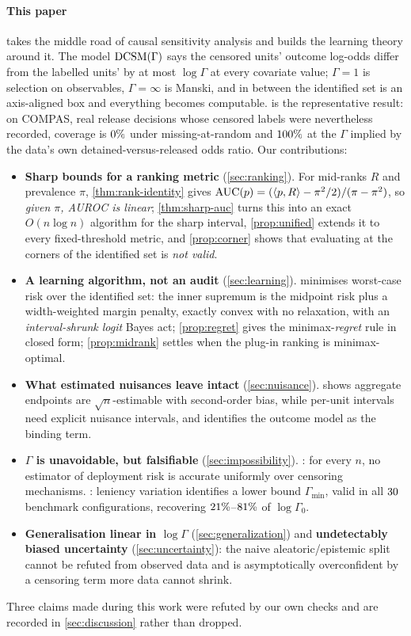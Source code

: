 \paragraph{This paper} takes the middle road of causal sensitivity analysis and
builds the learning theory around it. The model $\textup{DCSM}(\Gamma)$ says the
censored units' outcome log-odds differ from the labelled units' by at most
$\log\Gamma$ at every covariate value; $\Gamma=1$ is selection on observables,
$\Gamma=\infty$ is Manski, and in between the identified set is an axis-aligned
box and everything becomes computable.  is the representative
result: on COMPAS, real release decisions whose censored labels were
nevertheless recorded, coverage is $0\%$ under missing-at-random
and $100\%$ at the $\Gamma$ implied by the data's own
detained-versus-released odds ratio. Our contributions:
\begin{itemize}
\item \textbf{Sharp bounds for a ranking metric} (\cref{sec:ranking}).
  For mid-ranks $R$ and prevalence $\pi$, \cref{thm:rank-identity} gives
  $\operatorname{AUC}(p)=(\langle p,R\rangle-\pi^2/2)/(\pi-\pi^2)$, so \emph{given $\pi$,
  AUROC is linear}; \cref{thm:sharp-auc} turns this into an exact
  $O(n\log n)$ algorithm for the sharp interval, \cref{prop:unified} extends it
  to every fixed-threshold metric, and \cref{prop:corner} shows that evaluating
  at the corners of the identified set is \emph{not valid}.
\item \textbf{A learning algorithm, not an audit} (\cref{sec:learning}).
   minimises worst-case risk over the identified set: the inner
  supremum is the midpoint risk plus a width-weighted margin penalty, exactly
  convex with no relaxation, with an \emph{interval-shrunk logit} Bayes act;
  \cref{prop:regret} gives the minimax-\emph{regret} rule in closed form;
  \cref{prop:midrank} settles when the plug-in ranking is minimax-optimal.
\item \textbf{What estimated nuisances leave intact} (\cref{sec:nuisance}).
   shows aggregate endpoints are $\sqrt n$-estimable with
  second-order bias, while per-unit intervals need explicit nuisance
  intervals, and identifies the outcome model as the binding term.
\item \textbf{$\Gamma$ is unavoidable, but falsifiable}
  (\cref{sec:impossibility}). : for every $n$, no
  estimator of deployment risk is accurate uniformly over censoring
  mechanisms. : leniency variation identifies a lower bound
  $\Gamma_{\min}$, valid in all $30$ benchmark configurations,
  recovering $21\%$--$81\%$ of $\log\Gamma_0$.
\item \textbf{Generalisation linear in $\log\Gamma$} (\cref{sec:generalization})
  and \textbf{undetectably biased uncertainty} (\cref{sec:uncertainty}):
  the naive aleatoric/epistemic split cannot be refuted from observed data and
  is asymptotically overconfident by a censoring term more data cannot shrink.
\end{itemize}
Three claims made during this work were refuted by our own checks and are
recorded in \cref{sec:discussion} rather than dropped.

